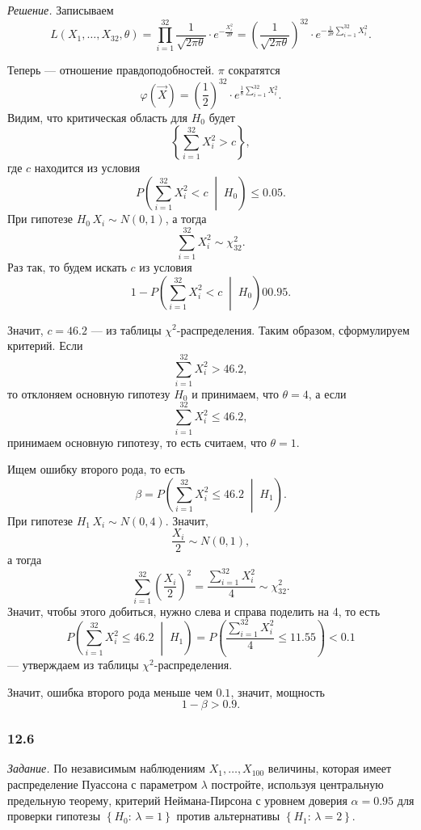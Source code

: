 \textit{Решение.} Записываем
$$L \left( X_1, \dotsc, X_{32}, \theta \right) =
  \prod \limits_{i = 1}^{32} \frac{1}{ \sqrt{2 \pi \theta }} \cdot e^{- \frac{X_i^2}{2 \theta }} =
  \left( \frac{1}{ \sqrt{2 \pi \theta }} \right)^{32} \cdot
  e^{- \frac{1}{2 \theta} \sum \limits_{i = 1}^{32} X_i^2}.$$

Теперь --- отношение правдоподобностей.
$ \pi $ сократятся
$$ \varphi \left( \vec{X} \right) =
   \left( \frac{1}{2} \right)^{32} \cdot e^{\frac{1}{8} \sum \limits_{i = 1}^{32} X_i^2}.$$
Видим, что критическая область для $H_0$ будет
$$ \left\{ \sum \limits_{i = 1}^{32} X_i^2 > c \right\},$$
где $c$ находится из условия
$$P \left( \sum \limits_{i = 1}^{32} X_i^2 < c \; \middle| \; H_0 \right) \leq
  0.05.$$
При гипотезе $H_0 \, X_i \sim N \left( 0, 1 \right) $, а тогда
$$ \sum \limits_{i = 1}^{32} X_i^2 \sim
  \chi_{32}^2.$$
Раз так, то будем искать $c$ из условия
$$1 - P \left( \sum \limits_{i = 1}^{32} X_i^2 < c \; \middle| \; H_0 \right) 0
  0.95.$$

Значит, $c = 46.2$ --- из таблицы $ \chi^2$-распределения.
Таким образом, сформулируем критерий.
Если
$$ \sum \limits_{i = 1}^{32} X_i^2 >
  46.2,$$
то отклоняем основную гипотезу $H_0$ и принимаем, что $ \theta = 4$, а если
$$ \sum \limits_{i = 1}^{32} X_i^2 \leq
  46.2,$$
принимаем основную гипотезу, то есть считаем, что $ \theta = 1$.

Ищем ошибку второго рода, то есть
$$ \beta =
  P \left( \sum \limits_{i = 1}^{32} X_i^2 \leq 46.2 \; \middle| \; H_1 \right).$$
При гипотезе $H_1 \, X_i \sim N \left( 0, 4 \right) $.
Значит,
$$ \frac{X_i}{2} \sim
  N \left( 0, 1 \right),$$
а тогда
$$ \sum \limits_{i = 1}^{32} \left( \frac{X_i}{2} \right)^2 =
  \frac{ \sum \limits_{i = 1}^{32} X_i^2}{4} \sim
  \chi_{32}^2.$$
Значит, чтобы этого добиться, нужно слева и справа поделить на 4, то есть
$$P \left( \sum \limits_{i = 1}^{32} X_i^2 \leq 46.2 \; \middle| \; H_1 \right) =
  P \left( \frac{ \sum \limits_{i = 1}^{32} X_i^2}{4} \leq 11.55 \right) <
  0.1$$
--- утверждаем из таблицы $ \chi^2$-распределения.

Значит, ошибка второго рода меньше чем $0.1$, значит, мощность
$$1 - \beta >
  0.9.$$

\subsubsection*{12.6}

\textit{Задание.}
По независимым наблюдениям $X_1, \dotsc, X_{100}$ величины,
которая имеет распределение Пуассона с параметром $ \lambda $ постройте,
используя центральную предельную теорему,
критерий Неймана-Пирсона с уровнем доверия $ \alpha = 0.95$ для проверки гипотезы
$ \left\{ H_0: \, \lambda = 1 \right\} $ против альтернативы
$ \left\{ H_1: \, \lambda = 2 \right\} $.

